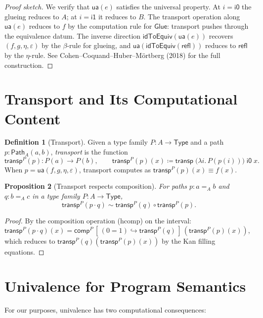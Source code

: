 \documentclass[11pt,a4paper]{report}
\theoremstyle{definition}
\newtheorem{definition}{Definition}[chapter]
\theoremstyle{plain}
\newtheorem{proposition}[definition]{Proposition}
\newcommand{\Path}{\mathsf{Path}}
\newcommand{\Type}{\mathsf{Type}}
\newcommand{\transp}{\mathsf{transp}}
\begin{document}
\begin{proof}[Proof sketch]
We verify that $\mathsf{ua}(e)$ satisfies the universal property.
At $i = \mathsf{i0}$ the glueing reduces to $A$; at $i = \mathsf{i1}$
it reduces to $B$.  The transport operation along
$\mathsf{ua}(e)$ reduces to $f$ by the computation rule for
$\mathsf{Glue}$: transport pushes through the equivalence datum.
The inverse direction $\mathsf{idToEquiv}(\mathsf{ua}(e))$ recovers
$(f, g, \eta, \varepsilon)$ by the $\beta$-rule for glueing,
and $\mathsf{ua}(\mathsf{idToEquiv}(\mathsf{refl}))$ reduces to
$\mathsf{refl}$ by the $\eta$-rule.
See Cohen--Coquand--Huber--M\"ortberg (2018) for the full
construction.
\end{proof}

\section{Transport and Its Computational Content}

\begin{definition}[Transport]
\label{def:transport}
Given a type family $P : A \to \Type$ and a path $p : \Path_A(a, b)$,
\emph{transport} is the function
\[
  \transp^P(p) : P(a) \to P(b), \qquad
  \transp^P(p)(x) \coloneqq \mathsf{transp}\;\big(\lambda i.\, P(p(i))\big)\;\mathsf{i0}\; x.
\]
When $p = \mathsf{ua}(f, g, \eta, \varepsilon)$, transport
computes as $\transp^P(p)(x) \equiv f(x)$.
\end{definition}

\begin{proposition}[Transport respects composition]
\label{prop:transp-comp}
For paths $p : a =_A b$ and $q : b =_A c$ in a type family
$P : A \to \Type$,
\[
  \transp^P(p \cdot q) \sim \transp^P(q) \circ \transp^P(p).
\]
\end{proposition}

\begin{proof}
By the composition operation (hcomp) on the interval:
$\transp^P(p \cdot q)(x) = \mathsf{comp}^P\,[\,(0=1) \hookrightarrow
\transp^P(q)\,]\,(\transp^P(p)(x))$, which reduces to
$\transp^P(q)(\transp^P(p)(x))$ by the Kan filling equations.
\end{proof}

\section{Univalence for Program Semantics}

For our purposes, univalence has two computational consequences:
\end{document}
